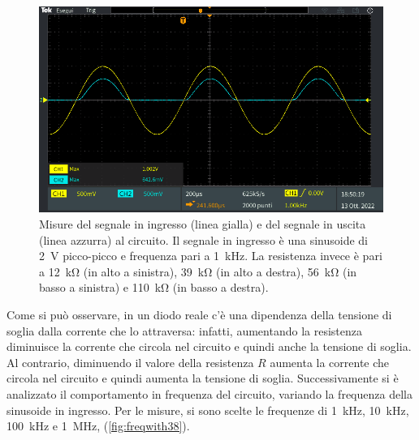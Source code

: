 \begin{figure}[h]
\begin{minipage}{.496\textwidth}
\end{minipage}
\begin{minipage}{.496\textwidth}
	\includegraphics[width=\linewidth]{./ImageFiles/Laboratorio 2/TEK00007.PNG}
\end{minipage}
	\caption{Misure del segnale in ingresso (linea gialla) e del segnale in uscita (linea azzurra) al circuito. Il segnale in ingresso è una sinusoide di \SI{2}{\volt} picco-picco e frequenza pari a \SI{1}{\kilo\hertz}. La resistenza invece è pari a \SI{12}{\kilo\ohm} (in alto a sinistra), \SI{39}{\kilo\ohm} (in alto a destra), \SI{56}{\kilo\ohm} (in basso a sinistra) e \SI{110}{\kilo\ohm} (in basso a destra).}
	\label{fig:voutvsresistance}
\end{figure}
Come si può osservare, in un diodo reale c'è una dipendenza della tensione di soglia dalla corrente che lo attraversa: infatti, aumentando la resistenza diminuisce la corrente che circola nel circuito e quindi anche la tensione di soglia. Al contrario, diminuendo il valore della resistenza $R$ aumenta la corrente che circola nel circuito e quindi aumenta la tensione di soglia.
Successivamente si è analizzato il comportamento in frequenza del circuito, variando la frequenza della sinusoide in ingresso. Per le misure, si sono scelte le frequenze di \SI{1}{\kilo\hertz}, \SI{10}{\kilo\hertz}, \SI{100}{\kilo\hertz} e \SI{1}{\mega\hertz}, (\Fig\ref{fig:freqwith38}).
